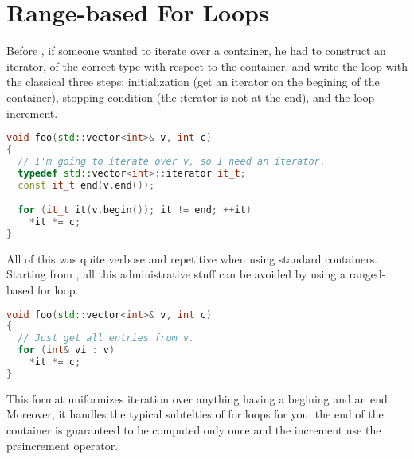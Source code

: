\section{Range-based For Loops}

Before , if someone wanted to iterate over a container, he had
to construct an iterator, of the correct type with respect to the
container, and write the loop with the classical three steps:
initialization (get an iterator on the begining of the container),
stopping condition (the iterator is not at the end), and the loop
increment.

\begin{lstlisting}[language=c++]
void foo(std::vector<int>& v, int c)
{
  // I'm going to iterate over v, so I need an iterator.
  typedef std::vector<int>::iterator it_t;
  const it_t end(v.end());

  for (it_t it(v.begin()); it != end; ++it)
    *it *= c;
}
\end{lstlisting}

All of this was quite verbose and repetitive when using standard
containers. Starting from , all this administrative stuff can be
avoided by using a ranged-based for loop.

\begin{lstlisting}[language=c++]
void foo(std::vector<int>& v, int c)
{
  // Just get all entries from v.
  for (int& vi : v)
    *it *= c;
}
\end{lstlisting}

This format uniformizes iteration over anything having a begining and
an end. Moreover, it handles the typical subtelties of for loops for
you: the end of the container is guaranteed to be computed only once
and the increment use the preincrement operator.
